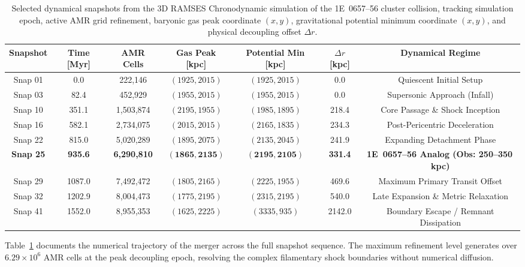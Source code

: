 \documentclass[aps,prd,reprint,superscriptaddress,nofootinbib,floatfix,amsmath,amssymb]{revtex4-2}
\begin{document}
\begin{table}[t]
\caption{Selected dynamical snapshots from the 3D RAMSES Chronodynamic simulation of the 1E~0657--56 cluster collision, tracking simulation epoch, active AMR grid refinement, baryonic gas peak coordinate $(x, y)$, gravitational potential minimum coordinate $(x, y)$, and physical decoupling offset $\Delta r$.}
\label{tab:snapshots}
\begin{ruledtabular}
\footnotesize
\begin{tabular}{ccccccc}
Snapshot & Time [Myr] & AMR Cells & Gas Peak [kpc] & Potential Min [kpc] & $\Delta r$ [kpc] & Dynamical Regime \\
\hline
Snap 01 & 0.0 & 222,146 & $(1925, 2015)$ & $(1925, 2015)$ & 0.0 & Quiescent Initial Setup \\
Snap 03 & 82.4 & 452,929 & $(1955, 2015)$ & $(1955, 2015)$ & 0.0 & Supersonic Approach (Infall) \\
Snap 10 & 351.1 & 1,503,874 & $(2195, 1955)$ & $(1985, 1895)$ & 218.4 & Core Passage \& Shock Inception \\
Snap 16 & 582.1 & 2,734,075 & $(2015, 2015)$ & $(2165, 1835)$ & 234.3 & Post-Pericentric Deceleration \\
Snap 22 & 815.0 & 5,020,289 & $(1895, 2075)$ & $(2135, 2045)$ & 241.9 & Expanding Detachment Phase \\
\textbf{Snap 25} & \textbf{935.6} & \textbf{6,290,810} & $\mathbf{(1865, 2135)}$ & $\mathbf{(2195, 2105)}$ & \textbf{331.4} & \textbf{1E~0657--56 Analog (Obs: 250--350\,kpc)} \\
Snap 29 & 1087.0 & 7,492,472 & $(1805, 2165)$ & $(2225, 1955)$ & 469.6 & Maximum Primary Transit Offset \\
Snap 32 & 1202.9 & 8,004,473 & $(1775, 2195)$ & $(2315, 2195)$ & 540.0 & Late Expansion \& Metric Relaxation \\
Snap 41 & 1552.0 & 8,955,353 & $(1625, 2225)$ & $(3335, 935)$ & 2142.0 & Boundary Escape / Remnant Dissipation \\
\end{tabular}
\end{ruledtabular}
\end{table}

Table~\ref{tab:snapshots} documents the numerical trajectory of the merger across the full snapshot sequence. The maximum refinement level generates over $6.29 \times 10^6$ AMR cells at the peak decoupling epoch, resolving the complex filamentary shock boundaries without numerical diffusion.
\end{document}
